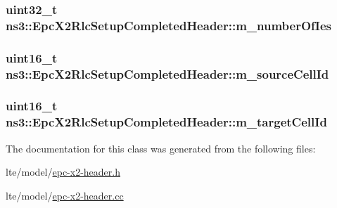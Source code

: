 \subsubsection[{\texorpdfstring{m\+\_\+number\+Of\+Ies}{m_numberOfIes}}]{\setlength{\rightskip}{0pt plus 5cm}uint32\+\_\+t ns3\+::\+Epc\+X2\+Rlc\+Setup\+Completed\+Header\+::m\+\_\+number\+Of\+Ies\hspace{0.3cm}{\ttfamily [private]}}\hypertarget{classns3_1_1EpcX2RlcSetupCompletedHeader_a68655f15c77b8b616c3f61759140a6ff}{}\label{classns3_1_1EpcX2RlcSetupCompletedHeader_a68655f15c77b8b616c3f61759140a6ff}
\subsubsection[{\texorpdfstring{m\+\_\+source\+Cell\+Id}{m_sourceCellId}}]{\setlength{\rightskip}{0pt plus 5cm}uint16\+\_\+t ns3\+::\+Epc\+X2\+Rlc\+Setup\+Completed\+Header\+::m\+\_\+source\+Cell\+Id\hspace{0.3cm}{\ttfamily [private]}}\hypertarget{classns3_1_1EpcX2RlcSetupCompletedHeader_af473d665a14f0f050a46ef97da3339c2}{}\label{classns3_1_1EpcX2RlcSetupCompletedHeader_af473d665a14f0f050a46ef97da3339c2}
\subsubsection[{\texorpdfstring{m\+\_\+target\+Cell\+Id}{m_targetCellId}}]{\setlength{\rightskip}{0pt plus 5cm}uint16\+\_\+t ns3\+::\+Epc\+X2\+Rlc\+Setup\+Completed\+Header\+::m\+\_\+target\+Cell\+Id\hspace{0.3cm}{\ttfamily [private]}}\hypertarget{classns3_1_1EpcX2RlcSetupCompletedHeader_a7360b08ef89d696d228a17eb26287817}{}\label{classns3_1_1EpcX2RlcSetupCompletedHeader_a7360b08ef89d696d228a17eb26287817}


The documentation for this class was generated from the following files\+:\begin{DoxyCompactItemize}
\item 
lte/model/\hyperlink{epc-x2-header_8h}{epc-\/x2-\/header.\+h}\item 
lte/model/\hyperlink{epc-x2-header_8cc}{epc-\/x2-\/header.\+cc}\end{DoxyCompactItemize}
